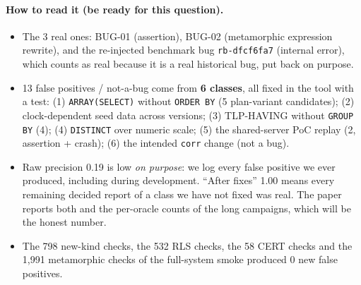 \paragraph{How to read it (be ready for this question).}
\begin{itemize}
  \item The 3 real ones: BUG-01 (assertion), BUG-02 (metamorphic expression
    rewrite), and the re-injected benchmark bug \texttt{rb-dfcf6fa7} (internal
    error), which counts as real because it is a real historical \pg bug, put
    back on purpose.
  \item 13 false positives / not-a-bug come from \textbf{6 classes}, all fixed
    in the tool with a test: (1) \texttt{ARRAY(SELECT)} without
    \texttt{ORDER BY} (5 plan-variant candidates); (2) clock-dependent seed
    data across versions; (3) TLP-HAVING without \texttt{GROUP BY} (4);
    (4) \texttt{DISTINCT} over numeric scale; (5) the shared-server PoC replay
    (2, assertion + crash); (6) the intended \texttt{corr} change (not a bug).
  \item Raw precision 0.19 is low \emph{on purpose}: we log every false
    positive we ever produced, including during development. ``After fixes''
    1.00 means every remaining decided report of a class we have not fixed was
    real. The paper reports both and the per-oracle counts of the long
    campaigns, which will be the honest number.
  \item The 798 new-kind checks, the 532 RLS checks, the 58 CERT checks and the
    1{,}991 metamorphic checks of the full-system smoke produced 0 new false
    positives.
\end{itemize}
